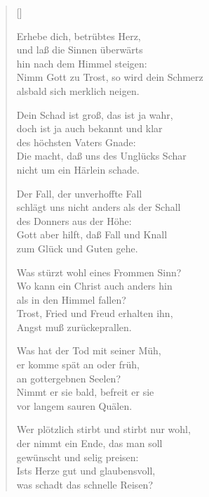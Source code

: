 \begin{multicols}{2}
\settowidth{\versewidth}{Was stürzt wohl eines Frommen Sinn?}
\begin{verse}[\versewidth]


 Erhebe dich, betrübtes Herz,\\
und laß die Sinnen überwärts\\
hin nach dem Himmel steigen:\\
Nimm Gott zu Trost, so wird dein Schmerz\\
alsbald sich merklich neigen.

 Dein Schad ist groß, das ist ja wahr,\\
doch ist ja auch bekannt und klar\\
des höchsten Vaters Gnade:\\
Die macht, daß uns des Unglücks Schar\\
nicht um ein Härlein schade.

 Der Fall, der unverhoffte Fall\\
schlägt uns nicht anders als der Schall\\
des Donners aus der Höhe:\\
Gott aber hilft, daß Fall und Knall\\
zum Glück und Guten gehe.

 Was stürzt wohl eines Frommen Sinn?\\
Wo kann ein Christ auch anders hin\\
als in den Himmel fallen?\\
Trost, Fried und Freud erhalten ihn,\\
Angst muß zurückeprallen.

 Was hat der Tod mit seiner Müh,\\
er komme spät an oder früh,\\
an gottergebnen Seelen?\\
Nimmt er sie bald, befreit er sie\\
vor langem sauren Quälen.

 Wer plötzlich stirbt und stirbt nur wohl,\\
der nimmt ein Ende, das man soll\\
gewünscht und selig preisen:\\
Ists Herze gut und glaubensvoll,\\
was schadt das schnelle Reisen?


\end{verse}
\end{multicols}
